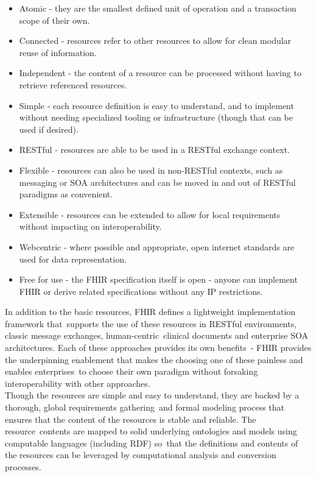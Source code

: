 \documentclass[DIV=calc, paper=a4, fontsize=12pt, onecolumn]{scrartcl}	 %
\begin{document}
\begin{itemize}
\item Atomic - they are the smallest defined unit of operation and a transaction scope of their own.
\item Connected - resources refer to other resources to allow for clean modular reuse of information.
\item Independent - the content of a resource can be processed without having to retrieve referenced resources.
\item Simple - each resource definition is easy to understand, and to implement without needing specialized tooling or infrastructure (though that can be used if desired).
\item RESTful - resources are able to be used in a RESTful exchange context.
\item Flexible - resources can also be used in non-RESTful contexts, such as messaging or SOA architectures and can be moved in and out of RESTful paradigms as convenient.
\item Extensible - resources can be extended to allow for local requirements without impacting on interoperability.
\item Webcentric - where possible and appropriate, open internet standards are used for data representation.
\item Free for use - the FHIR specification itself is open - anyone can implement FHIR or derive related specifications without any IP restrictions.
\end{itemize}

In addition to the basic resources, FHIR defines a lightweight implementation framework that\
supports the use of these resources in RESTful environments, classic message exchanges, human-centric\
 clinical documents and enterprise SOA architectures. Each of these approaches provides its own benefits\ 
- FHIR provides the underpinning enablement that makes the choosing one of these painless and enables enterprises\
 to choose their own paradigm without forsaking interoperability with other approaches.\\

Though the resources are simple and easy to understand, they are backed by a thorough, global requirements gathering\
 and formal modeling process that ensures that the content of the resources is stable and reliable. The resource\
contents are mapped to solid underlying ontologies and models using computable languages (including RDF) so\
that the definitions and contents of the resources can be leveraged by computational analysis and conversion processes.\\
\end{document}
